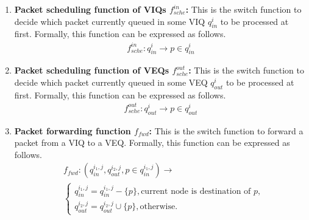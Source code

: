 \begin{enumerate}
	
	\item \textbf{Packet scheduling function of VIQs $f^{in}_{sche}$:} This is the switch function to decide which packet currently queued in some VIQ $q_{in}^{i}$ to be processed at first. Formally, this function can be expressed as follows. 
	\begin{align} \label{eqn:inschedule}
	 f^{in}_{sche}: q_{in}^{i} \longrightarrow p \in q_{in}^{i}
	\end{align}
	
	\item \textbf{Packet scheduling function of VEQs $f^{out}_{sche}$:} This is the switch function to decide which packet currently queued in some VEQ $q_{out}^{i}$ to be processed at first. Formally, this function can be expressed as follows. 
	\begin{align} \label{eqn:outschedule}
	f^{out}_{sche}: q_{out}^{i} \longrightarrow p \in q_{out}^{i}
	\end{align}
	
	\item \textbf{Packet forwarding function $ f_{fwd}$:} This is the switch function to forward a packet from a VIQ to a VEQ. Formally, this function can be expressed as follows. 
	\begin{align} \label{eqn:fwd}
	 &	f_{fwd}: (q_{in}^{i_1,j}, q_{out}^{i_2,j}, p\in q_{in}^{i_1,j})  \longrightarrow \nonumber \\
	 	&\begin{cases}
	 	 q_{in}^{i_1,j}=q_{in}^{i_1,j}-\{p\},  \text{current node is destination of } p,\\
	     q_{out}^{i_2,j}=q_{out}^{i_2,j}\cup\{p\}, \text{otherwise.} 
	 	\end{cases}
	\end{align}
	

\end{enumerate}
